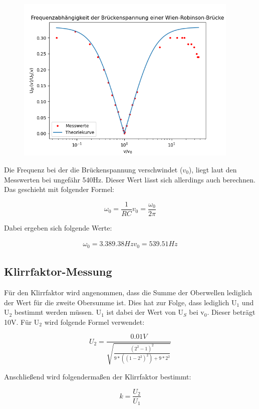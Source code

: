\begin{figure}[H]
    \centering
    \includegraphics[height=8cm]{"e.png"}
\end{figure}

Die Frequenz bei der die Brückenspannung verschwindet ($v_0$), liegt laut den Messwerten bei ungefähr 540Hz. Dieser Wert lässt sich allerdings auch berechnen. Das geschieht mit folgender Formel:

\begin{displaymath}
    \omega_0 = \frac{1}{RC}
    v_0 = \frac{\omega_0}{2\pi}
\end{displaymath}

Dabei ergeben sich folgende Werte:

\begin{align*}
    \omega_0= 3.389.38Hz
    v_0= 539.51Hz
\end{align*}

\subsection{Klirrfaktor-Messung}

Für den Klirrfaktor wird angenommen, dass die Summe der Oberwellen lediglich der Wert für die zweite Obersumme ist. Dies hat zur Folge, dass lediglich U$_1$ und U$_2$ bestimmt werden müssen. U$_1$ ist dabei der Wert von U$_S$ bei v$_0$. Dieser beträgt 10V. Für U$_2$ wird folgende Formel verwendet:

\begin{displaymath}
    U_2 = \frac{0.01V}{\sqrt{\frac{(2^2-1)^2}{9*((1-2^2)^2)+9*2^2}}}
\end{displaymath}

Anschließend wird folgendermaßen der Klirrfaktor bestimmt:

\begin{displaymath}
    k=\frac{U_2}{U_1}
\end{displaymath}

